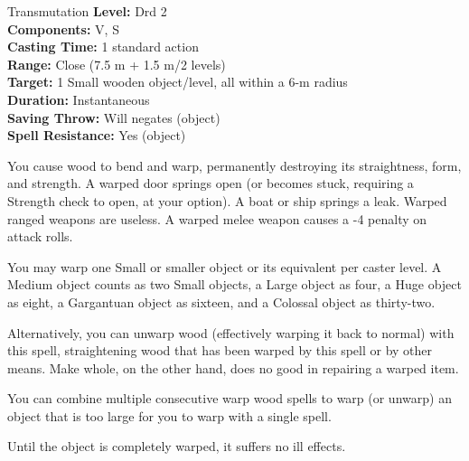 {Transmutation}
{
	\textbf{Level:}
	Drd 2\\
	\textbf{Components:}
	V, S\\
	\textbf{Casting Time:}
	1 standard action\\
	\textbf{Range:}
	Close (7.5 m + 1.5 m/2 levels)\\
	\textbf{Target:}
	1 Small wooden object/level, all within a 6-m radius\\
	\textbf{Duration:}
	Instantaneous\\
	\textbf{Saving Throw:}
	Will negates (object)\\
	\textbf{Spell Resistance:}
	Yes (object)\\
}
{
	You cause wood to bend and warp, permanently destroying its straightness, form, and strength. A warped door springs open (or becomes stuck, requiring a Strength check to open, at your option). A boat or ship springs a leak. Warped ranged weapons are useless. A warped melee weapon causes a -4 penalty on attack rolls.

	You may warp one Small or smaller object or its equivalent per caster level. A Medium object counts as two Small objects, a Large object as four, a Huge object as eight, a Gargantuan object as sixteen, and a Colossal object as thirty-two.

	Alternatively, you can unwarp wood (effectively warping it back to normal) with this spell, straightening wood that has been warped by this spell or by other means. Make whole, on the other hand, does no good in repairing a warped item.

	You can combine multiple consecutive warp wood spells to warp (or unwarp) an object that is too large for you to warp with a single spell.

	Until the object is completely warped, it suffers no ill effects.

}
